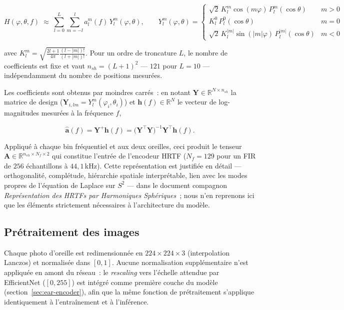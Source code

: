 \documentclass[12pt, a4paper]{article}
\begin{document}
\begin{equation}
    H(\varphi,\theta,f) \;\approx\;
    \sum_{l=0}^{L}\sum_{m=-l}^{l} a_l^m(f)\, Y_l^m(\varphi,\theta),
    \qquad
    Y_l^m(\varphi,\theta) =
    \begin{cases}
        \sqrt{2}\,K_l^m \cos(m\varphi)\,P_l^{m}(\cos\theta) & m>0\\
        K_l^0\,P_l^0(\cos\theta) & m=0\\
        \sqrt{2}\,K_l^{|m|} \sin(|m|\varphi)\,P_l^{|m|}(\cos\theta) & m<0
    \end{cases}
    \label{eq:sh-basis}
\end{equation}

avec $K_l^m = \sqrt{\tfrac{2l+1}{4\pi}\tfrac{(l-|m|)!}{(l+|m|)!}}$. Pour un
ordre de troncature $L$, le nombre de coefficients est fixe et vaut
$n_{sh}=(L+1)^2$ — $121$ pour $L=10$ — indépendamment du nombre de
positions mesurées.

Les coefficients sont obtenus par moindres carrés~: en notant
$\mathbf{Y}\in\mathbb{R}^{N\times n_{sh}}$ la matrice de design
($\mathbf{Y}_{i,lm}=Y_l^m(\varphi_i,\theta_i)$) et
$\mathbf{h}(f)\in\mathbb{R}^N$ le vecteur de log-magnitudes mesurées à la
fréquence $f$,

\begin{equation}
    \hat{\mathbf{a}}(f) = \mathbf{Y}^{+}\mathbf{h}(f)
    = \bigl(\mathbf{Y}^\top\mathbf{Y}\bigr)^{-1}\mathbf{Y}^\top \mathbf{h}(f).
    \label{eq:sh-lstsq}
\end{equation}

Appliqué à chaque bin fréquentiel et aux deux oreilles, ceci produit le
tenseur $\mathbf{A}\in\mathbb{R}^{n_{sh}\times N_f \times 2}$ qui constitue
l'entrée de l'encodeur HRTF ($N_f=129$ pour un FIR de $256$ échantillons à
$44{,}1$\,kHz). Cette représentation est justifiée en détail — orthogonalité,
complétude, hiérarchie spatiale interprétable, lien avec les modes propres
de l'équation de Laplace sur $S^2$ — dans le document compagnon
\textit{Représentation des HRTFs par Harmoniques Sphériques}~\cite{SHCompanion};
nous n'en reprenons ici que les éléments strictement nécessaires à
l'architecture du modèle.

\subsection{Prétraitement des images}

Chaque photo d'oreille est redimensionnée en $224\times224\times3$
(interpolation Lanczos) et normalisée dans $[0,1]$. Aucune normalisation
supplémentaire n'est appliquée en amont du réseau~: le \textit{rescaling}
vers l'échelle attendue par EfficientNet ($[0,255]$) est intégré comme
première couche du modèle (section~\ref{sec:ear-encoder}), afin que la
même fonction de prétraitement s'applique identiquement à l'entraînement
et à l'inférence.
\end{document}
